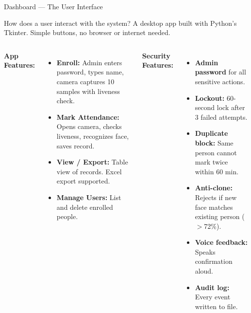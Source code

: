 \documentclass[aspectratio=169,11pt]{beamer}
\begin{document}
\begin{frame}{Dashboard --- The User Interface}\small
\begin{block}{How does a user interact with the system?}
\small A desktop app built with Python's Tkinter. Simple buttons, no browser or internet needed.
\end{block}
\vspace{-2pt}
\begin{columns}[T]
\textbf{App Features:}\\[2pt]
\footnotesize
\begin{itemize}\setlength\itemsep{1pt}
  \item \textbf{Enroll:} Admin enters password, types name, camera captures 10 samples with liveness check.
  \item \textbf{Mark Attendance:} Opens camera, checks liveness, recognizes face, saves record.
  \item \textbf{View / Export:} Table view of records. Excel export supported.
  \item \textbf{Manage Users:} List and delete enrolled people.
\end{itemize}
\textbf{Security Features:}\\[2pt]
\footnotesize
\begin{itemize}\setlength\itemsep{1pt}
  \item \textbf{Admin password} for all sensitive actions.
  \item \textbf{Lockout:} 60-second lock after 3 failed attempts.
  \item \textbf{Duplicate block:} Same person cannot mark twice within 60 min.
  \item \textbf{Anti-clone:} Rejects if new face matches existing person ($>$72\%).
  \item \textbf{Voice feedback:} Speaks confirmation aloud.
  \item \textbf{Audit log:} Every event written to file.
\end{itemize}
\end{columns}
\end{frame}
\end{document}

